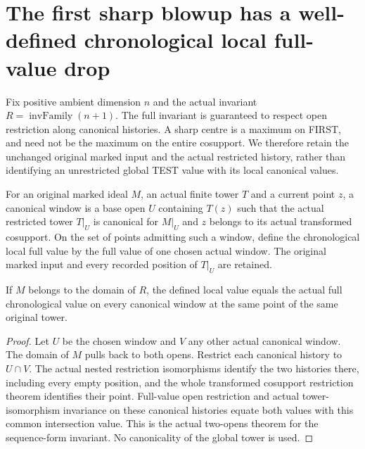 \section{The first sharp blowup has a well-defined chronological local full-value drop}

Fix positive ambient dimension $n$ and the actual invariant
$R=\operatorname{invFamily}(n+1)$. The full invariant is guaranteed to
respect open restriction along canonical histories. A sharp centre is a
maximum on FIRST, and need not be the maximum on the entire cosupport.
We therefore retain the unchanged original marked input and the actual
restricted history, rather than identifying an unrestricted global TEST
value with its local canonical values.

\begin{definition}
\label{hir:sharp-actual-chronological-canonical-window-value}
\leanok
For an original marked ideal $M$, an actual finite tower $T$ and a current
point $z$, a canonical window is a base open $U$ containing $T(z)$ such
that the actual restricted tower $T|_U$ is canonical for $M|_U$ and $z$
belongs to its actual transformed cosupport. On the set of points admitting
such a window, define the chronological local full value by the full value
of one chosen actual window. The original marked input and every recorded
position of $T|_U$ are retained.
\end{definition}

\begin{theorem}
\label{hir:sharp-actual-chronological-window-independence}
\leanok
If $M$ belongs to the domain of $R$, the defined local value equals the
actual full chronological value on every canonical window at the same
point of the same original tower.
\end{theorem}
\begin{proof}
Let $U$ be the chosen window and $V$ any other actual canonical window.
The domain of $M$ pulls back to both opens. Restrict each canonical history
to $U\cap V$. The actual nested restriction isomorphisms identify the two
histories there, including every empty position, and the whole transformed
cosupport restriction theorem identifies their point. Full-value open
restriction and actual tower-isomorphism invariance on these canonical
histories equate both values with this common intersection value. This is
the actual two-opens theorem for the sequence-form invariant. No
canonicality of the global tower is used.
\end{proof}

